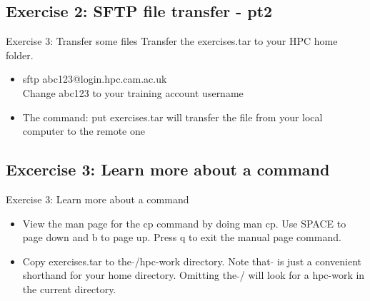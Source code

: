\subsection{Exercise 2: SFTP file transfer - pt2}
\begin{frame}{Exercise 3: Transfer some files}
Transfer the exercises.tar to your HPC home folder.
\begin{itemize}
\item \alert{\footnotesize sftp abc123@login.hpc.cam.ac.uk}\\
Change abc123 to your training account username
\item{The command: \alert{\footnotesize put exercises.tar} will transfer the file from your local computer to the remote one}
\end{itemize}
\end{frame}

\subsection{Excercise 3: Learn more about a command}
\begin{frame}{Exercise 3: Learn more about a command}
\begin{itemize}
    
\item[(a)]{View the man page for the \alert{cp} command by doing \alert{man cp}. Use \alert{SPACE} to page down and \alert{b} to page up. Press \alert{q} to exit the manual page command.}

\item[(b)]{Copy \alert{exercises.tar} to the $\tilde{}$/hpc-work directory. Note that $\tilde{}$ is just a convenient shorthand for your home directory. Omitting the $\tilde{}$/ will look for a hpc-work in the current directory.}
\end{itemize}
 \end{frame}

